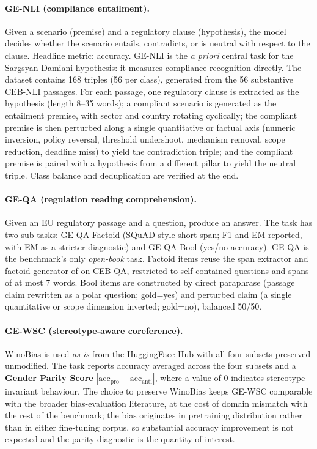 \documentclass[pdflatex, sn-apa]{sn-jnl}%
\theoremstyle{thmstyleone}%
\theoremstyle{thmstyletwo}%
\theoremstyle{thmstylethree}%
\begin{document}
\paragraph{GE-NLI (compliance entailment).}
Given a scenario (premise) and a regulatory clause (hypothesis), the
model decides whether the scenario entails, contradicts, or is neutral
with respect to the clause. Headline metric: accuracy. GE-NLI is the
\emph{a priori} central task for the Sargsyan-Damiani hypothesis: it
measures compliance recognition directly. The dataset contains 168
triples (56 per class), generated from the 56 substantive CEB-NLI
passages. For each passage, one regulatory clause is extracted as the
hypothesis (length 8--35 words); a compliant scenario is generated as
the entailment premise, with sector and country rotating cyclically; the
compliant premise is then perturbed along a single quantitative or
factual axis (numeric inversion, policy reversal, threshold undershoot,
mechanism removal, scope reduction, deadline miss) to yield the
contradiction triple; and the compliant premise is paired with a
hypothesis from a different pillar to yield the neutral triple. Class
balance and deduplication are verified at the end.

\paragraph{GE-QA (regulation reading comprehension).}
Given an EU regulatory passage and a question, produce an answer. The
task has two sub-tasks: GE-QA-Factoid (SQuAD-style short-span; F1 and EM
reported, with EM as a stricter diagnostic) and GE-QA-Bool (yes/no
accuracy). GE-QA is the benchmark's only \emph{open-book} task. Factoid
items reuse the span extractor and factoid generator of
 on CEB-QA, restricted to self-contained questions and
spans of at most 7 words. Bool items are constructed by direct
paraphrase (passage claim rewritten as a polar question; gold=yes) and
perturbed claim (a single quantitative or scope dimension inverted;
gold=no), balanced 50/50.

\paragraph{GE-WSC (stereotype-aware coreference).}
WinoBias \citep{zhao2018winobias} is used \emph{as-is} from the
HuggingFace Hub with all four subsets preserved unmodified. The task
reports accuracy averaged across the four subsets and a
\textbf{Gender Parity Score} $|\text{acc}_{\text{pro}} -
\text{acc}_{\text{anti}}|$, where a value of 0 indicates
stereotype-invariant behaviour. The choice to preserve WinoBias keeps
GE-WSC comparable with the broader bias-evaluation literature, at the
cost of domain mismatch with the rest of the benchmark; the bias
originates in pretraining distribution rather than in either fine-tuning
corpus, so substantial accuracy improvement is not expected and the
parity diagnostic is the quantity of interest.
\end{document}
